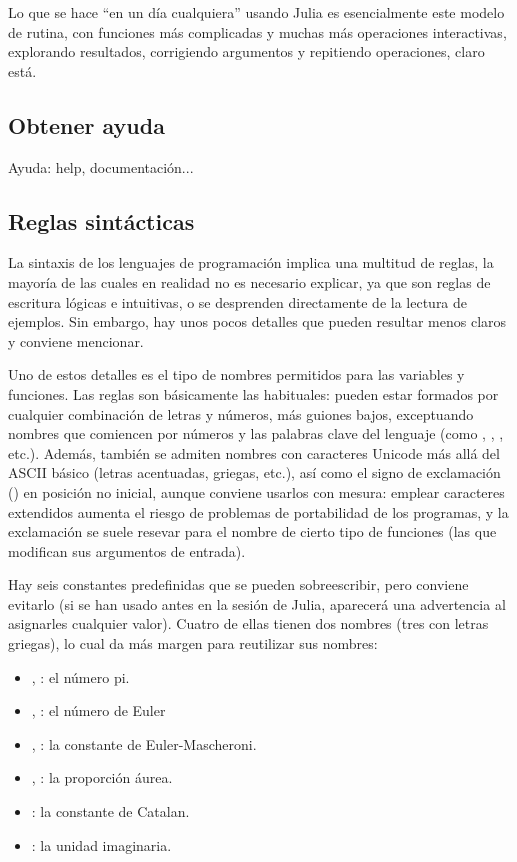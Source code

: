 Lo que se hace ``en un día cualquiera'' usando Julia es esencialmente este modelo de rutina, con funciones más complicadas y muchas más operaciones interactivas, explorando resultados, corrigiendo argumentos y repitiendo operaciones, claro está.


\subsection{Obtener ayuda}
Ayuda: help, documentación...


\subsection{Reglas sintácticas}

La sintaxis de los lenguajes de programación implica una multitud de reglas, la mayoría de las cuales en realidad no es necesario explicar, ya que son reglas de escritura lógicas e intuitivas, o se desprenden directamente de la lectura de ejemplos. Sin embargo, hay unos pocos detalles que pueden resultar menos claros y conviene mencionar.

Uno de estos detalles es el tipo de nombres permitidos para las variables y funciones. Las reglas son básicamente las habituales: pueden estar formados por cualquier combinación de letras y números, más guiones bajos, exceptuando nombres que comiencen por números y las palabras clave del lenguaje (como , , , etc.). Además, también se admiten nombres con caracteres Unicode más allá del ASCII básico (letras acentuadas, griegas, etc.), así como el signo de exclamación (\code{!}) en posición no inicial, aunque conviene usarlos con mesura: emplear caracteres extendidos aumenta el riesgo de problemas de portabilidad de los programas, y la exclamación se suele resevar para el nombre de cierto tipo de funciones (las que modifican sus argumentos de entrada).

Hay seis constantes predefinidas que se pueden sobreescribir, pero conviene evitarlo (si se han usado antes en la sesión de Julia, aparecerá una advertencia al asignarles cualquier valor). Cuatro de ellas tienen dos nombres (tres con letras griegas), lo cual da más margen para reutilizar sus nombres:

\begin{itemize}
  \item {}, : el número pi.
  \item {}, : el número de Euler
  \item {}, : la constante de Euler-Mascheroni.
  \item {}, : la proporción áurea.
  \item {}: la constante de Catalan.
  \item {}: la unidad imaginaria.
\end{itemize}

